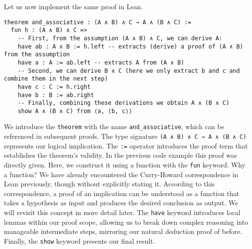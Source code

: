 \begin{example}
Let us now implement the same proof in Lean.
\begin{lstlisting}[language=Lean, caption=Associativity of Conjunction in Lean]
theorem and_associative : (A ∧ B) ∧ C → A ∧ (B ∧ C) :=
  fun h : (A ∧ B) ∧ C =>
    -- First, from the assumption (A ∧ B) ∧ C, we can derive A:
    have ab : A ∧ B := h.left -- extracts (derive) a proof of (A ∧ B) from the assumption
    have a : A := ab.left -- extracts A from (A ∧ B)
    -- Second, we can derive B ∧ C (here we only extract b and c and combine them in the next step) 
    have c : C := h.right
    have b : B := ab.right
    -- Finally, combining these derivations we obtain A ∧ (B ∧ C)
    show A ∧ (B ∧ C) from ⟨a, ⟨b, c⟩⟩
\end{lstlisting}
We introduce the \lstinline[language=lean]|theorem| with the name 
\lstinline[language=lean]|and_associative|, 
which can be referenced in subsequent proofs. 
The type signature \lstinline[language=lean]|(A ∧ B) ∧ C → A ∧ (B ∧ C)| 
represents our logical implication.
The \lstinline[language=lean]|:=| operator introduces the 
proof term that establishes the theorem's validity. 
In the previous code example this proof was directly given.
Here, we construct it using a function with the \lstinline[language=lean]|fun| keyword. 
Why a function? We have already encountered the Curry-Howard correspondence in Lean 
previously, though without explicitly stating it. 
According to this correspondence, a proof of an implication can be 
understood as a function that takes a hypothesis as input and produces 
the desired conclusion as output. We will revisit this concept in more 
detail later.
The \lstinline[language=lean]|have| keyword introduces local 
lemmas within our proof scope, allowing us to break down complex 
reasoning into manageable intermediate steps, mirroring our natural deduction proof of before.
Finally, the \lstinline[language=lean]|show| keyword presents our final result. 
\end{example}

